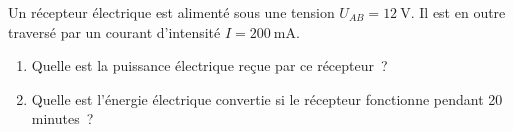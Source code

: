 Un récepteur électrique est alimenté sous une tension $U_{AB}=\qty{12}{\V}$. Il
est en outre traversé par un courant d'intensité $I=\qty{200}{\mA}$.
\begin{enumerate}
    \item Quelle est la puissance électrique reçue par ce récepteur~?
    \item Quelle est l'énergie électrique convertie si le récepteur fonctionne
          pendant 20 minutes~?
\end{enumerate}
